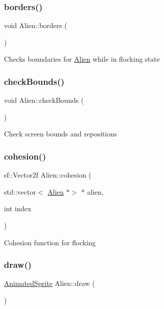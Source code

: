 \subsubsection{\texorpdfstring{borders()}{borders()}}
{\footnotesize\ttfamily void Alien\+::borders (\begin{DoxyParamCaption}{ }\end{DoxyParamCaption})}

Checks boundaries for \hyperlink{class_alien}{Alien} while in flocking state \mbox{\label{class_alien_a1f94914265a34170958fbf0cc4dbf187}} 
\subsubsection{\texorpdfstring{check\+Bounds()}{checkBounds()}}
{\footnotesize\ttfamily void Alien\+::check\+Bounds (\begin{DoxyParamCaption}{ }\end{DoxyParamCaption})}

Check screen bounds and repositions \mbox{\label{class_alien_ad84aef6c1b05152acbed764aaf457442}} 
\subsubsection{\texorpdfstring{cohesion()}{cohesion()}}
{\footnotesize\ttfamily sf\+::\+Vector2f Alien\+::cohesion (\begin{DoxyParamCaption}\item[{std\+::vector$<$ \hyperlink{class_alien}{Alien} $\ast$$>$ $\ast$}]{alien,  }\item[{int}]{index }\end{DoxyParamCaption})}

Cohesion function for flocking \mbox{\label{class_alien_a518e51803e638c46d0452ba283f2aad6}} 
\subsubsection{\texorpdfstring{draw()}{draw()}}
{\footnotesize\ttfamily \hyperlink{class_animated_sprite}{Animated\+Sprite} Alien\+::draw (\begin{DoxyParamCaption}{ }\end{DoxyParamCaption})}

